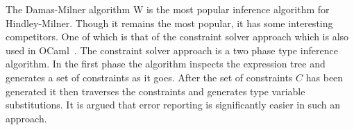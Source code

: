 \begin{remark}
    The Damas-Milner algorithm W is the most popular inference algorithm for Hindley-Milner.
    Though it remains the most popular, it has some interesting competitors.
    One of which is that of the constraint solver approach which is also used in OCaml~\cite{heeren2002generalizing}.
    The constraint solver approach is a two phase type inference algorithm.
    In the first phase the algorithm inspects the expression tree and generates a set of constraints as it goes.
    After the set of constraints $C$ has been generated it then traverses the constraints and generates type variable substitutions.
    It is argued that error reporting is significantly easier in such an approach.
\end{remark}
